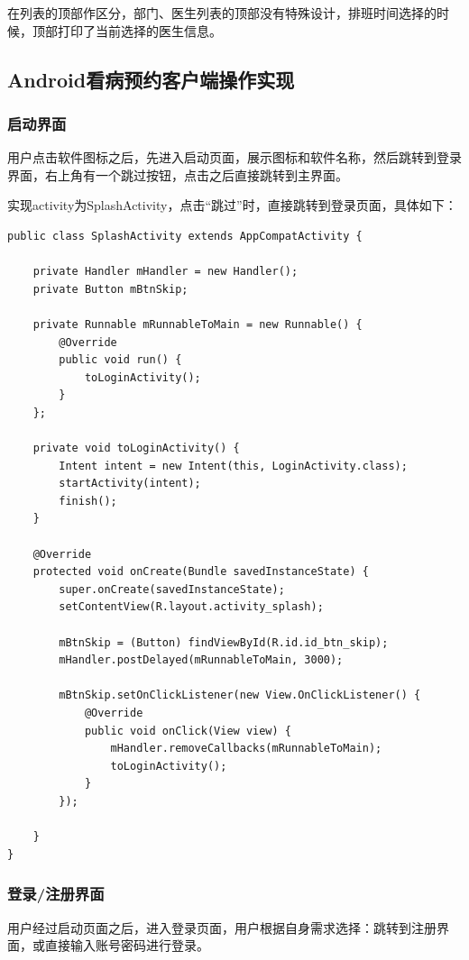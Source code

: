 \documentclass[UTF8,12pt]{article}
\begin{document}
在列表的顶部作区分，部门、医生列表的顶部没有特殊设计，排班时间选择的时候，顶部打印了当前选择的医生信息。

\newpage

\subsection{Android看病预约客户端操作实现}
\subsubsection{启动界面}
用户点击软件图标之后，先进入启动页面，展示图标和软件名称，然后跳转到登录界面，右上角有一个跳过按钮，点击之后直接跳转到主界面。

实现activity为SplashActivity，点击“跳过”时，直接跳转到登录页面，具体如下：

\begin{lstlisting}[frame=shadowbox]
    public class SplashActivity extends AppCompatActivity {

    private Handler mHandler = new Handler();
    private Button mBtnSkip;

    private Runnable mRunnableToMain = new Runnable() {
        @Override
        public void run() {
            toLoginActivity();
        }
    };

    private void toLoginActivity() {
        Intent intent = new Intent(this, LoginActivity.class);
        startActivity(intent);
        finish();
    }

    @Override
    protected void onCreate(Bundle savedInstanceState) {
        super.onCreate(savedInstanceState);
        setContentView(R.layout.activity_splash);

        mBtnSkip = (Button) findViewById(R.id.id_btn_skip);
        mHandler.postDelayed(mRunnableToMain, 3000);

        mBtnSkip.setOnClickListener(new View.OnClickListener() {
            @Override
            public void onClick(View view) {
                mHandler.removeCallbacks(mRunnableToMain);
                toLoginActivity();
            }
        });

    }
}

\end{lstlisting}

\subsubsection{登录/注册界面}
用户经过启动页面之后，进入登录页面，用户根据自身需求选择：跳转到注册界面，或直接输入账号密码进行登录。
\end{document}
